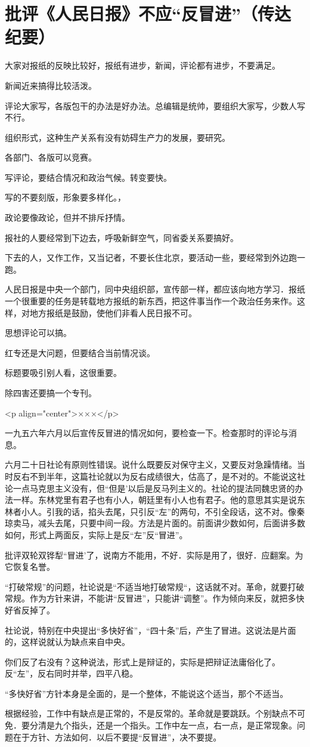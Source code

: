 \section[批评《人民日报》不应“反冒进”（传达纪要）（一九五八年一月）]{批评《人民日报》不应“反冒进”（传达纪要）}


大家对报纸的反映比较好，报纸有进步，新闻，评论都有进步，不要满足。

新闻近来搞得比较活泼。

评论大家写，各版包干的办法是好办法。总编辑是统帅，要组织大家写，少数人写不行。

组织形式，这种生产关系有没有妨碍生产力的发展，要研究。

各部门、各版可以竞赛。

写评论，要结合情况和政治气候。转变要快。

写的不要刻版，形象要多样化。，

政论要像政论，但并不排斥抒情。

报社的人要经常到下边去，呼吸新鲜空气，同省委关系要搞好。

下去的人，又作工作，又当记者，不要长住北京，要活动一些，要经常到外边跑一跑。

人民日报是中央一个部门，同中央组织部，宣传部一样，都应该向地方学习．报纸一个很重要的任务是转载地方报纸的新东西，把这件事当作一个政治任务来作。这样，对地方报纸是鼓励，使他们非看人民日报不可。

思想评论可以搞。

红专还是大问题，但要结合当前情况谈。

标题要吸引别人看，这很重要。

除四害还要搞一个专刊。

<p align="center">×××</p>

一九五六年六月以后宣传反冒进的情况如何，要检查一下。检查那时的评论与消息。

六月二十日社论有原则性错误。说什么既要反对保守主义，又要反对急躁情绪。当时反右不到半年，这篇社论就以为反右成绩很大，估高了，是不对的。不能说这社论一点马克思主义没有，但“但是’以后是反马列主义的。社论的提法同魏忠贤的办法一样。东林党里有君子也有小人，朝廷里有小人也有君子。他的意思其实是说东林者小人。引我的话，掐头去尾，只引反“左”的两句，不引全段话，这不对。像秦琼卖马，减头去尾，只要中间一段。方法是片面的。前面讲少数如何，后面讲多数如何，形式上两面反，实际上是反“左”反“冒进”。

批评双轮双铧犁“冒进’了，说南方不能用，不好．实际是用了，很好．应翻案。为它恢复名誉。

“打破常规”的问题，社论说是“不适当地打破常规“，这话就不对。革命，就要打破常规。作为方针来讲，不能讲“反冒进”，只能讲“调整”。作为倾向来反，就把多快好省反掉了。

社论说，特别在中央提出“多快好省”，“四十条”后，产生了冒进。这说法是片面的，这样说就认为缺点来自中央。

你们反了右没有？这种说法，形式上是辩证的，实际是把辩证法庸俗化了。反“左”，反右同时并举，四平八稳。

“多快好省”方针本身是全面的，是一个整体，不能说这个适当，那个不适当。

根据经验，工作中有缺点是正常的，不是反常的。革命就是要跳跃。个别缺点不可免．要分清是九个指头，还是一个指头。工作中左一点，右一点，是正常现象。问题在于方针、方法如何．以后不要提“反冒进”，决不要提。



